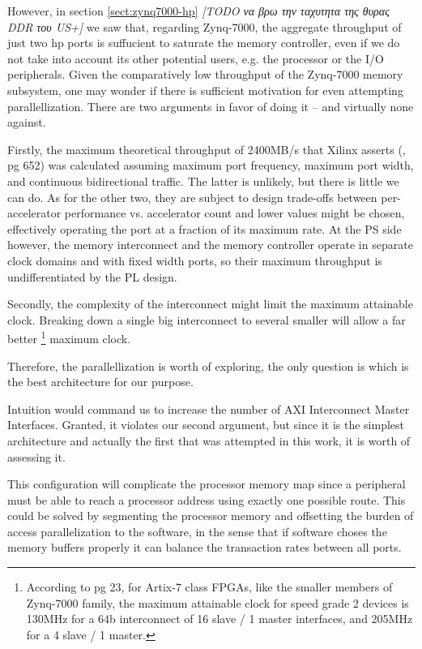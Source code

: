 However, in section \ref{sect:zynq7000-hp} 
\emph{[TODO να βρω την ταχυτητα της θυρας DDR του US+]} 
we saw that, regarding Zynq-7000,
the aggregate throughput of just two \gls{hp} ports
is suffucient to saturate the memory controller, 
even if we do not take into account its other potential users, 
e.g. the processor or the I/O peripherals.
Given the comparatively low throughput of the Zynq-7000 memory subsystem,
one may wonder if there is sufficient motivation for even attempting parallellization.
There are two arguments in favor of doing it -- and virtually none against.

Firstly, the maximum theoretical throughput of 2400MB/s that Xilinx asserts (\cite{pg585}, pg 652)
was calculated assuming maximum port frequency, maximum port width, and continuous bidirectional
traffic. The latter is unlikely, but there is little we can do. As for the other two,
they are subject to design trade-offs between per-accelerator performance vs. accelerator count
and lower values might be chosen, effectively operating the port at a fraction of its
maximum rate. At the PS side however, the memory interconnect and the memory controller
operate in separate clock domains and with fixed width ports,
so their maximum throughput is undifferentiated by the PL design.

Secondly, the complexity of the interconnect might limit the maximum attainable clock.
Breaking down a single big interconnect to several smaller will allow a far better
	\footnote{
		According to \cite{pg059} pg 23, for Artix-7 class FPGAs, 
		like the smaller members of Zynq-7000 family, the maximum attainable
		clock for speed grade 2 devices is 130MHz for a 64b interconnect of
		16 slave / 1 master interfaces, and 205MHz for a 4 slave / 1 master.
	}
maximum clock.

Therefore, the parallellization is worth of exploring, the only question is
which is the best architecture for our purpose.

Intuition would command us to increase the number of AXI Interconnect
Master Interfaces. Granted, it violates our second argument, but since
it is the simplest architecture and actually the first that was attempted
in this work, it is worth of assessing it.

This configuration will complicate the processor memory map
since a peripheral must be able to reach a processor address using
exactly one possible route. 
This could be solved by segmenting the processor memory
and offsetting the burden of access parallelization to the software,
in the sense that if software choses the memory buffers properly
it can balance the \gls{transaction} rates between all ports.

